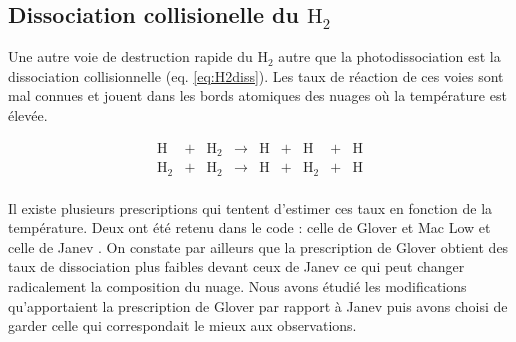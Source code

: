 



\subsection{Dissociation collisionelle du $\mathrm{H}_2$}

Une autre voie de destruction rapide du $\mathrm{H}_2$ autre que la photodissociation est la dissociation collisionnelle (eq. \ref{eq:H2diss}). Les taux de réaction de ces voies sont mal connues et jouent dans les bords atomiques des nuages où la température est élevée. 

\begin{equation}\label{eq:H2diss}
    \begin{array}{lcccccccl}
        \mathrm{H} & + & \mathrm{H}_2   & \rightarrow &\mathrm{H}  & + & \mathrm{H} & + & \mathrm{H} \\
        \mathrm{H}_2  & + & \mathrm{H}_2  & \rightarrow & \mathrm{H} & + &\mathrm{H}_2  & + & \mathrm{H} \\
    \end{array}
\end{equation}

Il existe plusieurs prescriptions qui tentent d'estimer ces taux en fonction de la température. Deux ont été retenu dans le code : celle de Glover et Mac Low \cite{GloverMacLow_2007} et celle de Janev \cite{Janev2003}. On constate par ailleurs que la prescription de Glover obtient des taux de dissociation plus faibles devant ceux de Janev ce qui peut changer radicalement la composition du nuage. Nous avons étudié les modifications qu'apportaient la prescription de Glover par rapport à Janev puis avons choisi de garder celle qui correspondait le mieux aux observations.


